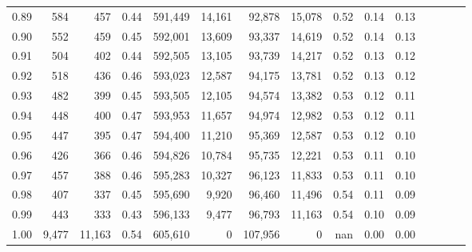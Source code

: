 \begin{tabular}{rrrcrrrrrrrrrrr}
0.89 &     584 &     457 &                                       0.44 &  591,449 &   14,161 &   92,878 &   15,078 &  0.52 &  0.14 &                         0.13 \\
0.90 &     552 &     459 &                                       0.45 &  592,001 &   13,609 &   93,337 &   14,619 &  0.52 &  0.14 &                         0.13 \\
0.91 &     504 &     402 &                                       0.44 &  592,505 &   13,105 &   93,739 &   14,217 &  0.52 &  0.13 &                         0.12 \\
0.92 &     518 &     436 &                                       0.46 &  593,023 &   12,587 &   94,175 &   13,781 &  0.52 &  0.13 &                         0.12 \\
0.93 &     482 &     399 &                                       0.45 &  593,505 &   12,105 &   94,574 &   13,382 &  0.53 &  0.12 &                         0.11 \\
0.94 &     448 &     400 &                                       0.47 &  593,953 &   11,657 &   94,974 &   12,982 &  0.53 &  0.12 &                         0.11 \\
0.95 &     447 &     395 &                                       0.47 &  594,400 &   11,210 &   95,369 &   12,587 &  0.53 &  0.12 &                         0.10 \\
0.96 &     426 &     366 &                                       0.46 &  594,826 &   10,784 &   95,735 &   12,221 &  0.53 &  0.11 &                         0.10 \\
0.97 &     457 &     388 &                                       0.46 &  595,283 &   10,327 &   96,123 &   11,833 &  0.53 &  0.11 &                         0.10 \\
0.98 &     407 &     337 &                                       0.45 &  595,690 &    9,920 &   96,460 &   11,496 &  0.54 &  0.11 &                         0.09 \\
0.99 &     443 &     333 &                                       0.43 &  596,133 &    9,477 &   96,793 &   11,163 &  0.54 &  0.10 &                         0.09 \\
1.00 &   9,477 &  11,163 &                                       0.54 &  605,610 &        0 &  107,956 &        0 &   nan &  0.00 &                         0.00 \\
\bottomrule
\end{tabular}
